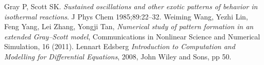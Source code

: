 \documentclass[a4paper,11pt]{article}
\begin{document}
\clearpage
\begin{thebibliography}{}
 Gray P, Scott SK. {\it Sustained oscillations and other exotic patterns of behavior in isothermal reactions}. J Phys Chem 1985;89:22–32.
 Weiming Wang, Yezhi Lin, Feng Yang, Lei Zhang, Yongji Tan, {\it Numerical study of pattern formation in an extended Gray–Scott model}, Communications in Nonlinear Science and Numerical Simulation, 16 (2011).
 Lennart Edsberg {\it Introduction to Computation and Modelling for Differential Equations}, 2008, John Wiley and Sons, pp 50.
\end{thebibliography}
\end{document}
